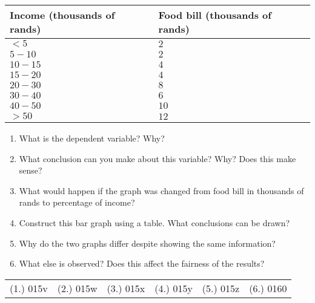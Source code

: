 {\begin{center}
\begin{tabular}{|l|l|}
\hline
Income (thousands of rands) & Food bill (thousands of rands) \\ 
\hline
 $<5$  & $2$  \\
 $5-10$  & $2$  \\
 $10-15$ & $4$  \\
 $15-20$ & $4$  \\
 $20-30$ & $8$  \\
 $30-40$ & $6$  \\
 $40-50$ & $10$ \\
 $>50$ & $12$ \\
\hline
\end{tabular}
\end{center}

\begin{enumerate}
\item What is the dependent variable? Why?
\item What conclusion can you make about this variable? Why? Does this make sense? 
\item What would happen if the graph was changed from food bill in thousands of rands to percentage of income?
\item Construct this bar graph using a table. What conclusions can be drawn?
\item Why do the two graphs differ despite showing the same information?
\item What else is observed? Does this affect the fairness of the results? 
\end{enumerate}


\par \practiceinfo
\par \begin{tabular}[h]{cccccc}
(1.)	015v	&
(2.)	015w	&
(3.)	015x	&
(4.)	015y	&
(5.)	015z	&
(6.)	0160	\\ %
\end{tabular}}
